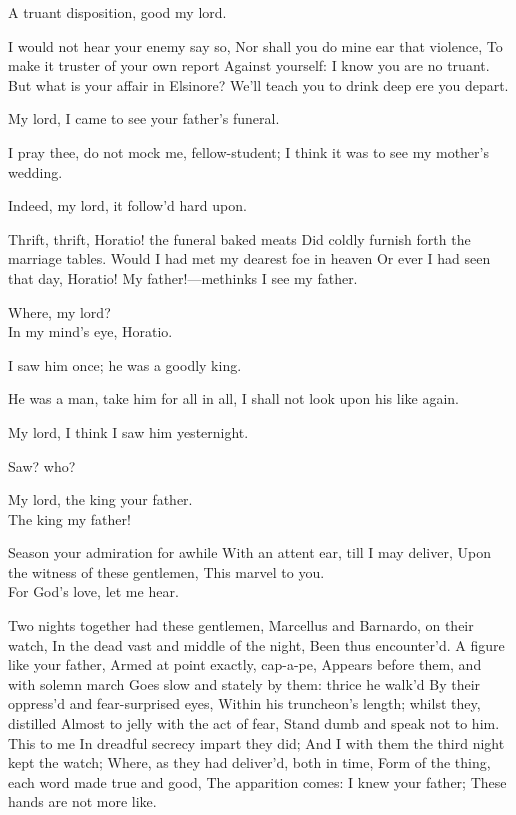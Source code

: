 \documentclass[11pt]{book}
\begin{document}
\6	A truant disposition, good my lord.

\1	I would not hear your enemy say so,
	Nor shall you do mine ear that violence,
	To make it truster of your own report
	Against yourself: I know you are no truant.
	But what is your affair in Elsinore?
	We'll teach you to drink deep ere you depart.

\6	My lord, I came to see your father's funeral.

\1	I pray thee, do not mock me, fellow-student;
	I think it was to see my mother's wedding.

\6	Indeed, my lord, it follow'd hard upon.

\1	Thrift, thrift, Horatio! the funeral baked meats
	Did coldly furnish forth the marriage tables.
	Would I had met my dearest foe in heaven
	Or ever I had seen that day, Horatio!
	My father!---methinks I see my father.

\6	Where, my lord? \\

\1	                  In my mind's eye, Horatio.

\6	I saw him once; he was a goodly king.

\1	He was a man, take him for all in all,
	I shall not look upon his like again.

\6	My lord, I think I saw him yesternight.

\1	Saw? who?

\6	My lord, the king your father. \\

\1	The king my father!

\6	Season your admiration for awhile
	With an attent ear, till I may deliver,
	Upon the witness of these gentlemen,
	This marvel to you. \\

\1	For God's love, let me hear.

\6	Two nights together had these gentlemen,
	Marcellus and Barnardo, on their watch,
	In the dead vast and middle of the night,
	Been thus encounter'd. A figure like your father,
	Armed at point exactly, cap-a-pe,
	Appears before them, and with solemn march
	Goes slow and stately by them: thrice he walk'd
	By their oppress'd and fear-surprised eyes,
	Within his truncheon's length; whilst they, distilled
	Almost to jelly with the act of fear,
	Stand dumb and speak not to him. This to me
	In dreadful secrecy impart they did;
	And I with them the third night kept the watch;
	Where, as they had deliver'd, both in time,
	Form of the thing, each word made true and good,
	The apparition comes: I knew your father;
	These hands are not more like. \\
\end{document}
